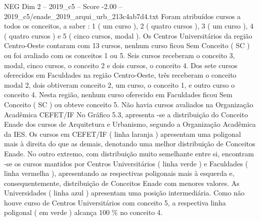 \begin{textsample}{NEG Dim 2 – 2019\_c5 – Score -2.00 – 2019\_c5/enade\_2019\_arqui\_urb\_213c4ab7d4.txt}
Foram atribuídos cursos a todos os conceitos, a saber : 1 ( um curso ), 2 ( quatro cursos ), 3 ( um curso ), 4 ( quatro cursos ) e 5 ( cinco cursos, modal ).
Os Centros Universitários da região Centro-Oeste contaram com 13 cursos, nenhum curso ficou Sem Conceito ( SC ) ou foi avaliado com os conceitos 1 ou 5.
Seis cursos receberam o conceito 3, modal, cinco cursos, o conceito 2 e dois cursos, o conceito 4.
Dos sete cursos oferecidos em Faculdades na região Centro-Oeste, três receberam o conceito modal 2, dois obtiveram conceito 2, um curso, o conceito 1, e outro curso o conceito 4.
Nesta região, nenhum curso oferecido em Faculdades ficou Sem Conceito ( SC ) ou obteve conceito 5.
Não havia cursos avaliados na Organização Acadêmica CEFET/IF No Gráfico 5.3, apresenta -se a distribuição do Conceito Enade dos cursos de Arquitetura e Urbanismo, segundo a Organização Acadêmica da IES.
Os cursos em CEFET/IF ( linha laranja ) apresentam uma poligonal mais à direita do que as demais, denotando uma melhor distribuição de Conceitos Enade.
No outro extremo, com distribuição muito semelhante entre si, encontram -se os cursos mantidos por Centros Universitários ( linha verde ) e Faculdades ( linha vermelha ), apresentando as respectivas poligonais mais à esquerda e, consequentemente, distribuição de Conceitos Enade com menores valores.
As Universidades ( linha azul ) apresentam uma posição intermediária.
Como não houve curso de Centros Universitários com conceito 5, a respectiva linha poligonal ( em verde ) alcança 100 \% no conceito 4.

\end{textsample}
